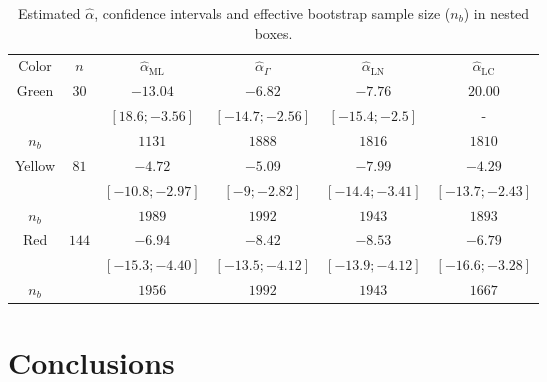 \documentclass[twocolumn]{svjour3}
\begin{document}
	\begin{table}[hbt]
		\centering
		\caption{Estimated $\widehat{\alpha}$, confidence intervals and effective bootstrap sample size ($n_b$) in nested boxes.}\label{ResultadosCorner} 
		\begin{tabular}{c*5{c}}
			\toprule
			Color       &  $n$    &  $\widehat{\alpha}_{\text{{ML}}}$    &  $\widehat{\alpha}_{\Gamma}$  &  $\widehat{\alpha}_{\text{{LN}}}$ &  $\widehat{\alpha}_{\text{{LC}}}$\\
			\cmidrule(lr){1-6}
			Green       & $30$  & $-13.04$  & $-6.82$  & $-7.76$     &  $20.00$  \\
			&                   & $[18.6;-3.56]$ & $[-14.7;-2.56]$  & $[-15.4;-2.5]$ & -\\
			$n_{b}$    	&       &  $1131$         & $1888$            &  $1816$          &   $1810$       \\ \midrule
			Yellow     & $81$   & $-4.72$  & $-5.0$9   & $-7.99$     &  $-4.29$    \\
			&       & $[-10.8;-2.97]$ & $[-9;-2.82]$ & $[-14.4;-3.41]$ & $[-13.7;-2.43]$\\
			$n_{b}$    	&       & $1989$          &  $1992$         &   $1943$        &  $1893$        \\ \midrule
			Red        & $144$  & $-6.94$  & $-8.42$   & $-8.53$     &   $-6.79$\\
			&           & $[-15.3;-4.40]$ & $[-13.5;-4.12]$ & $[-13.9;-4.12]$ & $[-16.6;-3.28]$\\
			$n_{b}$    	&       & $1956$          &  $1992$         &  $1943$         & $1667$         \\ \midrule
			\bottomrule
		\end{tabular}
	\end{table} 
	
		
		\section{Conclusions}
		\label{conclusion}
		
\end{document}
